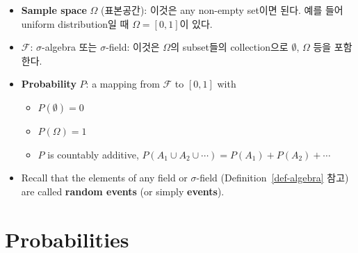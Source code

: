 \documentclass[
  letterpaper,
  DIV=11,
  numbers=noendperiod]{scrreprt}
\providecommand{\tightlist}{%
  \setlength{\itemsep}{0pt}\setlength{\parskip}{0pt}}
\theoremstyle{definition}
\theoremstyle{plain}
\theoremstyle{plain}
\theoremstyle{definition}
\theoremstyle{plain}
\theoremstyle{definition}
\theoremstyle{remark}
\begin{document}
\begin{itemize}
\item
  \textbf{Sample space} \(\Omega\) (표본공간): 이것은 any non-empty
  set이면 된다. 예를 들어 uniform distribution일 때 \(\Omega = [0,1]\)이
  있다.
\item
  \(\mathcal{F}\): \(\sigma\)-algebra 또는 \(\sigma\)-field: 이것은
  \(\Omega\)의 subset들의 collection으로 \(\emptyset\), \(\Omega\) 등을
  포함한다.
\item
  \textbf{Probability} \(P\): a mapping from \(\mathcal{F}\) to
  \([0,1]\) with

  \begin{itemize}
  \tightlist
  \item
    \(P(\emptyset)=0\)
  \item
    \(P(\Omega)=1\)
  \item
    \(P\) is countably additive,
    \(P(A_1 \cup A_2 \cup \cdots) = P(A_1) + P(A_2) + \cdots\)
  \end{itemize}
\end{itemize}

\begin{itemize}
\tightlist
\item
  Recall that the elements of any field or \(\sigma\)-field
  (Definition~\ref{def-algebra} 참고) are called \textbf{random events}
  (or simply \textbf{events}).
\end{itemize}

\section{Probabilities}\label{probabilities}
\end{document}
